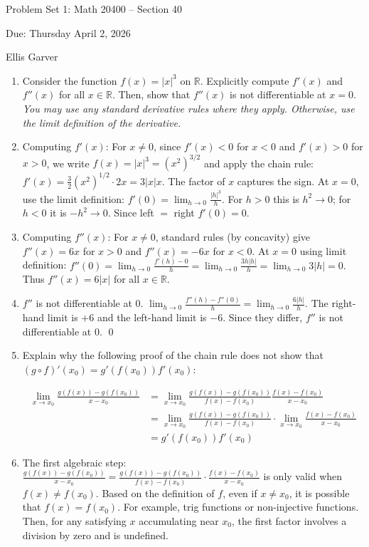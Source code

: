 \documentclass[12pt]{article}
\newcommand{\R}{\mathbb{R}}
\begin{document}
\centerline{\large Problem Set 1: Math 20400 -- Section 40}
\centerline{Due: Thursday April 2, 2026}
\centerline{Ellis Garver}
\begin{enumerate}

\item Consider the function $f(x) = |x|^3$ on $\mathbb R$. Explicitly compute $f'(x)$ and $f''(x)$ for all $x \in \R$. Then, show that $f''(x)$ is not differentiable at $x = 0$. \textit{You may use any standard derivative rules where they apply. Otherwise, use the limit definition of the derivative.}
\item[] Computing $f'(x)$: For $x \neq 0$, since $f'(x)<0$ for $x<0$ and $f'(x)>0$ for $x>0$, we write $f(x) = |x|^3 = (x^2)^{3/2}$ and apply the chain rule: $f'(x) = \frac{3}{2}(x^2)^{1/2} \cdot 2x = 3|x|x.$ The factor of $x$ captures the sign. At $x = 0$, use the limit definition: $f'(0) = \lim_{h \to 0} \frac{|h|^3}{h}.$
For $h > 0$ this is $h^2 \to 0$; for $h < 0$ it is $-h^2 \to 0$. Since left $=$ right $f'(0) = 0$.
 
\item[] Computing $f''(x)$: For $x \neq 0$, standard rules (by concavity) give $f''(x) = 6x$ for $x > 0$ and $f''(x) = -6x$ for $x < 0$. At $x = 0$ using limit definition:
$f''(0) = \lim_{h \to 0} \frac{f'(h) - 0}{h} = \lim_{h \to 0} \frac{3h|h|}{h} = \lim_{h \to 0} 3|h| = 0.$
Thus $f''(x) = 6|x|$ for all $x \in \R$.
 
\item[] $f''$ is not differentiable at $0$. $\lim_{h \to 0} \frac{f''(h) - f''(0)}{h} = \lim_{h \to 0} \frac{6|h|}{h}.$ The right-hand limit is $+6$ and the left-hand limit is $-6$. Since they differ, $f''$ is not differentiable at $0$. \qed

\item Explain why the following proof of the chain rule does not show that $(g \circ f)'(x_0) = g'(f(x_0)) f'(x_0)$:

\begin{align*}
\lim\limits_{x \to x_0} \frac{g(f(x)) - g(f(x_0))}{x - x_0} &= \lim_{x \to x_0} \frac{g(f(x)) - g(f(x_0))}{f(x) - f(x_0)} \frac{f(x) - f(x_0)}{x - x_0} \\
&= \lim_{x \to x_0} \frac{g(f(x)) - g(f(x_0))}{f(x) - f(x_0)} \cdot \lim_{x \to x_0} \frac{f(x) - f(x_0)}{x - x_0} \\
&= g'(f(x_0)) f'(x_0)
\end{align*}
\item[] The first algebraic step:
$\frac{g(f(x)) - g(f(x_0))}{x - x_0} = \frac{g(f(x)) - g(f(x_0))}{f(x) - f(x_0)} \cdot \frac{f(x) - f(x_0)}{x - x_0}$
is only valid when $f(x) \neq f(x_0)$. Based on the definition of $f$, even if $x\neq x_0$, it is possible that $f(x) = f(x_0)$. For example, trig functions or non-injective functions. Then, for any satisfying $x$ accumulating near $x_0$, the first factor involves a division by zero and is undefined.
 

\end{enumerate}
\end{document}
